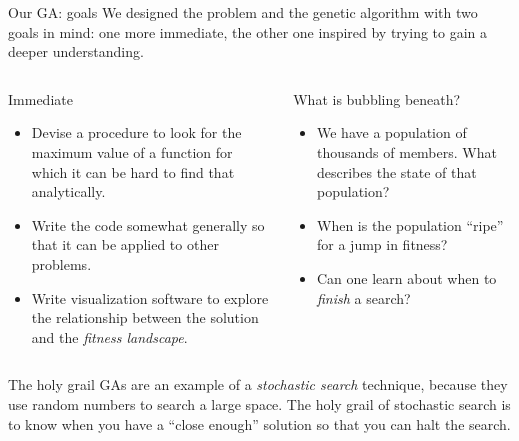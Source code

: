\documentclass[10pt,aspectratio=169]{beamer}
\begin{document}
\begin{frame}{Our GA: goals}
  We designed the problem and the genetic algorithm with two goals in
  mind: one more immediate, the other one inspired by trying to gain a
  deeper understanding.
  \vspace{-0.2cm}
  \begin{columns}[t]
    \begin{column}{0.5\textwidth}
      \begin{block}{Immediate}
        \begin{itemize}
          \pause\item
          Devise a procedure to look for the maximum value of a
          function for which it can be hard to find that analytically.\\
          \pause\item
          Write the code somewhat generally so that it can be applied
          to other problems.\\
          \pause\item
          Write visualization software to explore the relationship
          between the solution and the \emph{fitness landscape}.\\
        \end{itemize}
      \end{block}
    \end{column}
    \begin{column}{0.5\textwidth}
      \pause
      \begin{block}{What is bubbling beneath?}
        \begin{itemize}
          \pause\item
          We have a population of thousands of members.  What
          describes the state of that population?
          \pause\item
          When is the population ``ripe'' for a jump in fitness?
          \pause\item 
          Can one learn about when to \emph{finish} a search?
        \end{itemize}
      \end{block}
    \end{column}
  \end{columns}
  \pause
  \begin{block}{The holy grail}
    GAs are an example of a \emph{stochastic search} technique,
    because they use random numbers to search a large space.  The holy
    grail of stochastic search is to know when you have a ``close
    enough'' solution so that you can halt the search.
  \end{block}
\end{frame}
\end{document}
